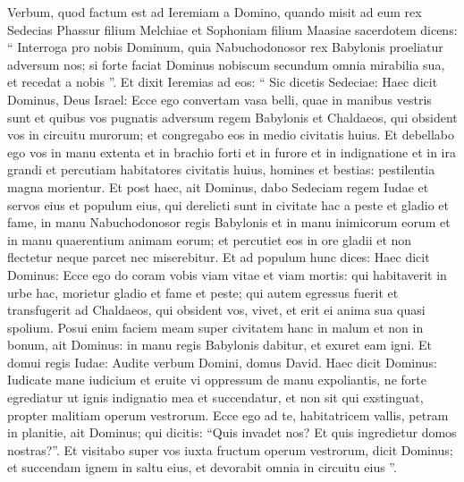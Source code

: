 \begin{biblechapter}
\begin{biblechapter}
\begin{biblechapter}
\begin{biblechapter}
\begin{biblechapter}
\begin{biblechapter}
\begin{biblechapter}
\begin{biblechapter}
\begin{biblechapter}
\begin{biblechapter}
\begin{biblechapter}
\begin{biblechapter}
\begin{biblechapter}
\begin{biblechapter}
\begin{biblechapter}
\begin{biblechapter}
\begin{biblechapter}
\begin{biblechapter}
\begin{biblechapter}
\begin{biblechapter}
\begin{biblechapter}
\verse Verbum, quod factum est ad Ieremiam a Domino, quando misit ad eum rex Sedecias Phassur filium Melchiae et Sophoniam filium Maasiae sacerdotem dicens: 
\verse “ Interroga pro nobis Dominum, quia Nabuchodonosor rex Babylonis proeliatur adversum nos; si forte faciat Dominus nobiscum secundum omnia mirabilia sua, et recedat a nobis ”. 
\verse Et dixit Ieremias ad eos: “ Sic dicetis Sedeciae: 
\verse Haec dicit Dominus, Deus Israel: Ecce ego convertam vasa belli, quae in manibus vestris sunt et quibus vos pugnatis adversum regem Babylonis et Chaldaeos, qui obsident vos in circuitu murorum; et congregabo eos in medio civitatis huius. 
\verse Et debellabo ego vos in manu extenta et in brachio forti et in furore et in indignatione et in ira grandi 
\verse et percutiam habitatores civitatis huius, homines et bestias: pestilentia magna morientur. 
\verse Et post haec, ait Dominus, dabo Sedeciam regem Iudae et servos eius et populum eius, qui derelicti sunt in civitate hac a peste et gladio et fame, in manu Nabuchodonosor regis Babylonis et in manu inimicorum eorum et in manu quaerentium animam eorum; et percutiet eos in ore gladii et non flectetur neque parcet nec miserebitur.
 \verse Et ad populum hunc dices: Haec dicit Dominus: Ecce ego do coram vobis viam vitae et viam mortis: 
\verse qui habitaverit in urbe hac, morietur gladio et fame et peste; qui autem egressus fuerit et transfugerit ad Chaldaeos, qui obsident vos, vivet, et erit ei anima sua quasi spolium. 
\verse Posui enim faciem meam super civitatem hanc in malum et non in bonum, ait Dominus: in manu regis Babylonis dabitur, et exuret eam igni.
 \verse Et domui regis Iudae:
 Audite verbum Domini,
 \verse domus David. Haec dicit Dominus:
 Iudicate mane iudicium
 et eruite vi oppressum de manu expoliantis,
 ne forte egrediatur ut ignis indignatio mea
 et succendatur, et non sit qui exstinguat,
 propter malitiam operum vestrorum.
 \verse Ecce ego ad te, habitatricem vallis,
 petram in planitie,
 ait Dominus;
 qui dicitis: “Quis invadet nos?
 Et quis ingredietur domos nostras?”.
 \verse Et visitabo super vos iuxta fructum operum vestrorum,
 dicit Dominus;
 et succendam ignem in saltu eius,
 et devorabit omnia in circuitu eius ”.
 

\end{biblechapter}
\end{biblechapter}
\end{biblechapter}
\end{biblechapter}
\end{biblechapter}
\end{biblechapter}
\end{biblechapter}
\end{biblechapter}
\end{biblechapter}
\end{biblechapter}
\end{biblechapter}
\end{biblechapter}
\end{biblechapter}
\end{biblechapter}
\end{biblechapter}
\end{biblechapter}
\end{biblechapter}
\end{biblechapter}
\end{biblechapter}
\end{biblechapter}
\end{biblechapter}
